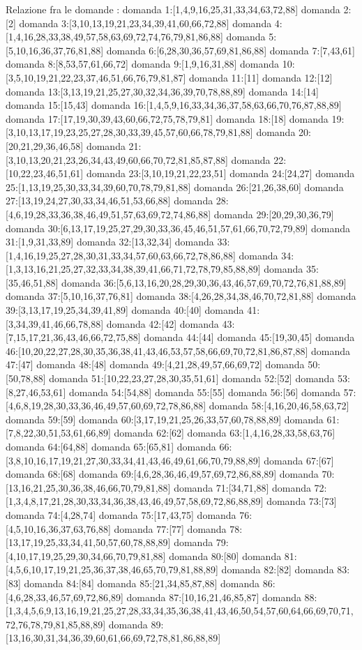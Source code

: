 Relazione fra le domande :
domanda 1:[1,4,9,16,25,31,33,34,63,72,88]
domanda 2:[2]
domanda 3:[3,10,13,19,21,23,34,39,41,60,66,72,88]
domanda 4:[1,4,16,28,33,38,49,57,58,63,69,72,74,76,79,81,86,88]
domanda 5:[5,10,16,36,37,76,81,88]
domanda 6:[6,28,30,36,57,69,81,86,88]
domanda 7:[7,43,61]
domanda 8:[8,53,57,61,66,72]
domanda 9:[1,9,16,31,88]
domanda 10:[3,5,10,19,21,22,23,37,46,51,66,76,79,81,87]
domanda 11:[11]
domanda 12:[12]
domanda 13:[3,13,19,21,25,27,30,32,34,36,39,70,78,88,89]
domanda 14:[14]
domanda 15:[15,43]
domanda 16:[1,4,5,9,16,33,34,36,37,58,63,66,70,76,87,88,89]
domanda 17:[17,19,30,39,43,60,66,72,75,78,79,81]
domanda 18:[18]
domanda 19:[3,10,13,17,19,23,25,27,28,30,33,39,45,57,60,66,78,79,81,88]
domanda 20:[20,21,29,36,46,58]
domanda 21:[3,10,13,20,21,23,26,34,43,49,60,66,70,72,81,85,87,88]
domanda 22:[10,22,23,46,51,61]
domanda 23:[3,10,19,21,22,23,51]
domanda 24:[24,27]
domanda 25:[1,13,19,25,30,33,34,39,60,70,78,79,81,88]
domanda 26:[21,26,38,60]
domanda 27:[13,19,24,27,30,33,34,46,51,53,66,88]
domanda 28:[4,6,19,28,33,36,38,46,49,51,57,63,69,72,74,86,88]
domanda 29:[20,29,30,36,79]
domanda 30:[6,13,17,19,25,27,29,30,33,36,45,46,51,57,61,66,70,72,79,89]
domanda 31:[1,9,31,33,89]
domanda 32:[13,32,34]
domanda 33:[1,4,16,19,25,27,28,30,31,33,34,57,60,63,66,72,78,86,88]
domanda 34:[1,3,13,16,21,25,27,32,33,34,38,39,41,66,71,72,78,79,85,88,89]
domanda 35:[35,46,51,88]
domanda 36:[5,6,13,16,20,28,29,30,36,43,46,57,69,70,72,76,81,88,89]
domanda 37:[5,10,16,37,76,81]
domanda 38:[4,26,28,34,38,46,70,72,81,88]
domanda 39:[3,13,17,19,25,34,39,41,89]
domanda 40:[40]
domanda 41:[3,34,39,41,46,66,78,88]
domanda 42:[42]
domanda 43:[7,15,17,21,36,43,46,66,72,75,88]
domanda 44:[44]
domanda 45:[19,30,45]
domanda 46:[10,20,22,27,28,30,35,36,38,41,43,46,53,57,58,66,69,70,72,81,86,87,88]
domanda 47:[47]
domanda 48:[48]
domanda 49:[4,21,28,49,57,66,69,72]
domanda 50:[50,78,88]
domanda 51:[10,22,23,27,28,30,35,51,61]
domanda 52:[52]
domanda 53:[8,27,46,53,61]
domanda 54:[54,88]
domanda 55:[55]
domanda 56:[56]
domanda 57:[4,6,8,19,28,30,33,36,46,49,57,60,69,72,78,86,88]
domanda 58:[4,16,20,46,58,63,72]
domanda 59:[59]
domanda 60:[3,17,19,21,25,26,33,57,60,78,88,89]
domanda 61:[7,8,22,30,51,53,61,66,89]
domanda 62:[62]
domanda 63:[1,4,16,28,33,58,63,76]
domanda 64:[64,88]
domanda 65:[65,81]
domanda 66:[3,8,10,16,17,19,21,27,30,33,34,41,43,46,49,61,66,70,79,88,89]
domanda 67:[67]
domanda 68:[68]
domanda 69:[4,6,28,36,46,49,57,69,72,86,88,89]
domanda 70:[13,16,21,25,30,36,38,46,66,70,79,81,88]
domanda 71:[34,71,88]
domanda 72:[1,3,4,8,17,21,28,30,33,34,36,38,43,46,49,57,58,69,72,86,88,89]
domanda 73:[73]
domanda 74:[4,28,74]
domanda 75:[17,43,75]
domanda 76:[4,5,10,16,36,37,63,76,88]
domanda 77:[77]
domanda 78:[13,17,19,25,33,34,41,50,57,60,78,88,89]
domanda 79:[4,10,17,19,25,29,30,34,66,70,79,81,88]
domanda 80:[80]
domanda 81:[4,5,6,10,17,19,21,25,36,37,38,46,65,70,79,81,88,89]
domanda 82:[82]
domanda 83:[83]
domanda 84:[84]
domanda 85:[21,34,85,87,88]
domanda 86:[4,6,28,33,46,57,69,72,86,89]
domanda 87:[10,16,21,46,85,87]
domanda 88:[1,3,4,5,6,9,13,16,19,21,25,27,28,33,34,35,36,38,41,43,46,50,54,57,60,64,66,69,70,71,72,76,78,79,81,85,88,89]
domanda 89:[13,16,30,31,34,36,39,60,61,66,69,72,78,81,86,88,89]


